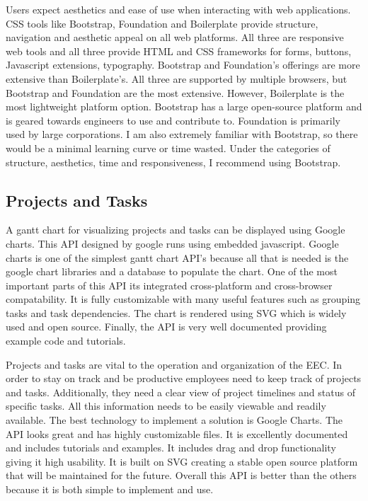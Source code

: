 \documentclass[letterpaper,10pt,titlepage,journal,compsoc,draftclsnofoot,onecolumn]{IEEEtran}
\newcommand\tab[1][1cm]{\hspace*{#1}}
\begin{document}
Users expect aesthetics and ease of use when interacting with web applications. CSS tools like Bootstrap, Foundation and Boilerplate provide structure, navigation and aesthetic appeal on all web platforms. All three are responsive web tools and all three provide HTML and CSS frameworks for forms, buttons, Javascript extensions, typography. Bootstrap and Foundation's offerings are more extensive than Boilerplate's. All three are supported by multiple browsers, but Bootstrap and Foundation are the most extensive. However, Boilerplate is the most lightweight platform option. Bootstrap has a large open-source platform and is geared towards engineers to use and contribute to. Foundation is primarily used by large corporations. I am also extremely familiar with Bootstrap, so there would be a minimal learning curve or time wasted. Under the categories of structure, aesthetics, time and responsiveness, I recommend using Bootstrap. 

\subsection{Projects and Tasks}

\tab A gantt chart for visualizing projects and tasks can be displayed using Google charts. This API designed by google runs using embedded javascript. Google charts is one of the simplest gantt chart API's because all that is needed is the google chart libraries and a database to populate the chart. One of the most important parts of this API its integrated cross-platform and cross-browser compatability. It is fully customizable with many useful features such as grouping tasks and task dependencies. The chart is rendered using SVG which is widely used and open source. Finally, the API is very well documented providing example code and tutorials.\newline

\tab Projects and tasks are vital to the operation and organization of the EEC. In order to stay on track and be productive employees need to keep track of projects and tasks. Additionally, they need a clear view of project timelines and status of specific tasks. All this information needs to be easily viewable and readily available. The best technology to implement a solution is Google Charts. The API looks great and has highly customizable files. It is excellently documented and includes tutorials and examples. It includes drag and drop functionality giving it high usability. It is built on SVG creating a stable open source platform that will be maintained for the future. Overall this API is better than the others because it is both simple to implement and use.
\end{document}
